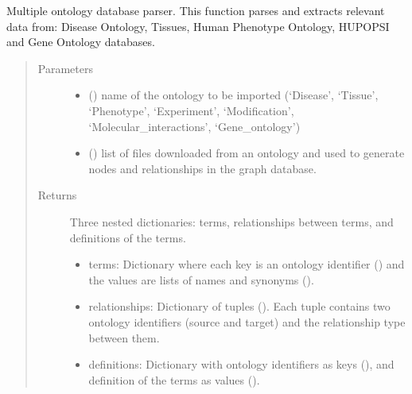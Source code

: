 \documentclass[letterpaper,10pt,english]{sphinxmanual}
\begin{document}
\begin{fulllineitems}
\label{\detokenize{_autosummary/graphdb_builder.ontologies.parsers:graphdb_builder.ontologies.parsers.oboParser.parser}}
Multiple ontology database parser.
This function parses and extracts relevant data from: Disease Ontology, Tissues, Human Phenotype Ontology,     HUPO\sphinxhyphen{}PSI and Gene Ontology databases.
\begin{quote}\begin{description}
\item[{Parameters}] \leavevmode\begin{itemize}
\item {} 
 () \textendash{} name of the ontology to be imported (‘Disease’, ‘Tissue’, ‘Phenotype’, ‘Experiment’,                         ‘Modification’, ‘Molecular\_interactions’, ‘Gene\_ontology’)

\item {} 
 () \textendash{} list of files downloaded from an ontology and used to generate nodes and relationships in the graph database.

\end{itemize}

\item[{Returns}] \leavevmode

Three nested dictionaries: terms, relationships between terms, and definitions of the terms.
\begin{itemize}
\item {} 
terms: Dictionary where each key is an ontology identifier () and the values are lists of names and synonyms ().

\item {} 
relationships: Dictionary of tuples (). Each tuple contains two ontology identifiers (source and target) and                         the relationship type between them.

\item {} 
definitions: Dictionary with ontology identifiers as keys (), and definition of the terms as values ().

\end{itemize}


\end{description}\end{quote}

\end{fulllineitems}
\end{document}
